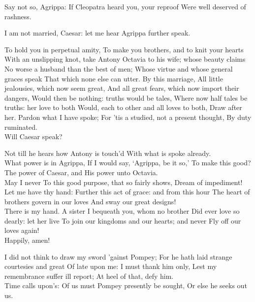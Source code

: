\documentclass{book}
\begin{document}
\3	                  Say not so, Agrippa:
	If Cleopatra heard you, your reproof
	Were well deserved of rashness.

\1	I am not married, Caesar: let me hear
	Agrippa further speak.

\4	To hold you in perpetual amity,
	To make you brothers, and to knit your hearts
	With an unslipping knot, take Antony
	Octavia to his wife; whose beauty claims
	No worse a husband than the best of men;
	Whose virtue and whose general graces speak
	That which none else can utter. By this marriage,
	All little jealousies, which now seem great,
	And all great fears, which now import their dangers,
	Would then be nothing: truths would be tales,
	Where now half tales be truths: her love to both
	Would, each to other and all loves to both,
	Draw after her. Pardon what I have spoke;
	For 'tis a studied, not a present thought,
	By duty ruminated.  \\

\1	                  Will Caesar speak?

\3	Not till he hears how Antony is touch'd
	With what is spoke already. \\

\1	What power is in Agrippa,
	If I would say, `Agrippa, be it so,'
	To make this good? \\

\3	                  The power of Caesar, and
	His power unto Octavia. \\

\1	May I never
	To this good purpose, that so fairly shows,
	Dream of impediment! Let me have thy hand:
	Further this act of grace: and from this hour
	The heart of brothers govern in our loves
	And sway our great designs! \\

\3	There is my hand.
	A sister I bequeath you, whom no brother
	Did ever love so dearly: let her live
	To join our kingdoms and our hearts; and never
	Fly off our loves again! \\

	Happily, amen!

\1	I did not think to draw my sword 'gainst Pompey;
	For he hath laid strange courtesies and great
	Of late upon me: I must thank him only,
	Lest my remembrance suffer ill report;
	At heel of that, defy him. \\

	Time calls upon's:
	Of us must Pompey presently be sought,
	Or else he seeks out us. \\
\end{document}

